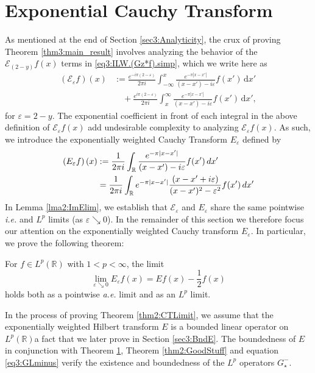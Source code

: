 \documentclass[../dissertation.tex]{subfiles}
\begin{document}
\section{Exponential Cauchy Transform}\label{sec3:CauchyTrans}

As mentioned at the end of Section \ref{sec3:Analyticity}, the crux of proving 
Theorem \ref{thm3:main_result} involves analyzing the behavior of the 
$\mathcal E_{(2-y)} f(x)$ terms in \eqref{eq3:ILW.(Gz*f).simp}, which we 
write here as
\begin{align*}
	\left( \mathcal E_\varepsilon f \right)(x) 
		&:=  \frac{e^{-i \pi (2-\varepsilon)}}{2 \pi i} 
			\int_{-\infty}^x 
				\frac{e^{-\pi|x-x'|}}{(x-x') - i\varepsilon} f(x') 
			\, \mathrm{d}x' \\
		&\quad + \frac{e^{i \pi (2-\varepsilon)}}{2 \pi i} 
			\int_x^{\infty} 
				\frac{e^{-\pi|x-x'|} }{(x-x') - i\varepsilon} f(x') 
			\, \mathrm{d}x',
\end{align*}
for $\varepsilon = 2-y$. The exponential coef{}ficient in front of each integral 
in the above definition of $\mathcal E_{\varepsilon}f(x)$ add undesirable 
complexity to analyzing $\mathcal E_{\varepsilon}f(x)$.\label{sym:expCauchy} As 
such, we introduce the exponentially weighted Cauchy Transform $E_\varepsilon$ 
defined by
\begin{align*}
	\left( E_\varepsilon f\right)(x)
 		&:= \frac{1}{2\pi i} \int_{\mathbb R} 
 				\frac{e^{-\pi|x-x'|}}{(x - x') - i \varepsilon} f(x') 
 			\,dx' \\
 		&= \frac{1}{2\pi i} \int_{\mathbb R} 
 				e^{-\pi|x-x'|} \frac{(x-x'+i\varepsilon)}{(x - x')^2 - \varepsilon^2} f(x') 
 			\,dx'
\end{align*}
In Lemma \ref{lma2:ImElim}, we establish that $\mathcal E_\varepsilon$ and $E_\varepsilon$
share the same pointwise \textit{i.e.} and $L^p$ limits (as $\varepsilon \searrow 0$).
In the remainder of this section we therefore focus our attention on the exponentially 
weighted Cauchy transform $E_\varepsilon$. In particular, we prove the following theorem:
\begin{thm}\label{thm2:CTLimit}
	For $f \in L^p(\mathbb R)$ with $1<p<\infty$, the limit 
	\[
		\lim_{\varepsilon\searrow 0} E_\varepsilon f(x) = Ef(x) - \frac{1}{2} f(x)
	\]
	holds both as a pointwise \textit{a.e.} limit and as an $L^p$ limit. 
\end{thm}
In the process of proving Theorem \ref{thm2:CTLimit}, we assume that the exponentially
weighted Hilbert transform 
$E$ is a bounded linear operator on $L^p(\mathbb R)$\textemdash{}a fact that we
later prove in Section \ref{sec3:BndE}. The boundedness of $E$ in conjunction with 
Theorem \ref{sec3:CauchyTrans}, Theorem \ref{thm2:GoodStuff} and equation 
\eqref{eq3:GLminus} verify the existence and boundedness of the $L^p$ 
operators $G_\star^-$.
\end{document}
